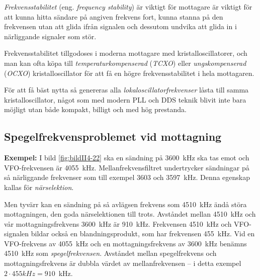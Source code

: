 \emph{Frekvensstabilitet} (eng. \emph{frequency stability}) är viktigt för
mottagare är viktigt för att kunna hitta sändare på angiven frekvens fort,
kunna stanna på den frekvensen utan att glida ifrån signalen och dessutom
undvika att glida in i närliggande signaler som stör.

Frekvensstabilitet tillgodoses i moderna mottagare med kristalloscillatorer,
och man kan ofta köpa till \emph{temperaturkompenserad} (\emph{TCXO}) eller
\emph{ungskompenserad} (\emph{OCXO}) kristalloscillator för att få en högre
frekvensstabilitet i hela mottagaren.

För att få bäst nytta så genereras alla \emph{lokaloscillatorfrekvenser} låsta
till samma kristalloscillator, något som med modern PLL och DDS teknik blivit
inte bara möjligt utan både kompakt, billigt och med hög prestanda.


\subsection{Spegelfrekvensproblemet vid mottagning}


\textbf{Exempel:}
I bild \ref{fig:bildII4-22} ska en sändning på 3600~kHz ska tas emot och
VFO-frekvensen är 4055~kHz.
Mellanfrekvensfiltret undertrycker sändningar på så närliggande frekvenser
som till exempel 3603 och 3597~kHz.
Denna egenskap kallas för \emph{närselektion}.

Men tyvärr kan en sändning på så avlägsen frekvens som 4510~kHz ändå
störa mottagningen, den goda närselektionen till trots.
Avståndet mellan 4510~kHz och vår mottagningsfrekvens 3600~kHz är 910~kHz.
Frekvensen 4510~kHz och VFO-signalen bildar också en blandningsprodukt,
som har frekvensen 455~kHz.
Vid en VFO-frekvens av 4055~kHz och en mottagningsfrekvens av 3600~kHz benämns
4510~kHz som \emph{spegelfrekvensen}.
Avståndet mellan spegelfrekvens och mottagningsfrekvens är dubbla värdet av
mellanfrekvensen -- i detta exempel \(2 \cdot 455kHz = 910\)~kHz.

